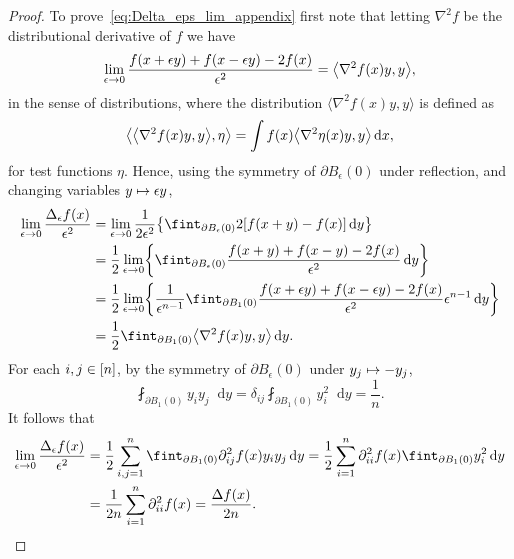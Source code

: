 \documentclass[AHL,Unicode,longabstracts]{cedram}
\newcommand{\dd}{n}
\newcommand*\diff{\mathop{}\!\mathrm{d}}
\newcommand{\avgint}{\fint}
\renewcommand*{\to}{\mathchoice{\longrightarrow}{\rightarrow}{\rightarrow}{\rightarrow}}
\let\oldmapsto\mapsto
\renewcommand*{\mapsto}{\mathchoice{\longmapsto}{\oldmapsto}{\oldmapsto}{\oldmapsto}}
\let\originalleft\left
\let\originalright\right
\renewcommand{\left}{\mathopen{}\mathclose\bgroup\originalleft}
\renewcommand{\right}{\aftergroup\egroup\originalright}
\let\oldin\in
\renewcommand{\in}{\mathchoice{\oldin}{\oldin}{\,\oldin\,}{\,\oldin\,}}
\begin{document}
\begin{proof}
To prove~\eqref{eq:Delta_eps_lim_appendix} first note that letting $ \nabla^2f$ be the distributional derivative of $f$ we have
\begin{align*}
\lim_{\epsilon\to 0}\frac{f(x+\epsilon y)+f(x-\epsilon y)-2f(x)}{\epsilon^2}=\left\langle \nabla^2f(x)y,y\right\rangle,
\end{align*}
in the sense of distributions, where the distribution $\langle \nabla^{2} f(x)y, y \rangle$ is defined as
\[
\left \langle \left\langle \nabla^{2} f(x)y, y \right\rangle, \eta \right \rangle =\int f(x) \left\langle \nabla^{2} \eta(x) y, y \right\rangle \diff x,
\]
for test functions $\eta$. Hence, using the symmetry of $\partial B_{\epsilon}(0)$ under reflection, and changing variables $y\mapsto \epsilon y$,
\begin{align*}
\lim_{\epsilon\to 0}\frac{\Delta_{\epsilon}f(x)}{\epsilon^2}&=\lim_{\epsilon\to 0}\frac{1}{2\epsilon^2}\left\{\avgint_{\partial B_{\epsilon}(0)}2[f(x+y)-f(x)]\diff y\right\}\\
&=\frac{1}{2}\lim_{\epsilon\to 0}\left\{\avgint_{\partial B_{\epsilon}(0)}\frac{f(x+y)+f(x-y)-2f(x)}{\epsilon^2}\diff y\right\}\\
&=\frac{1}{2}\lim_{\epsilon\to 0}\left\{\frac{1}{\epsilon^{\dd-1}}\avgint_{\partial B_{1}(0)}\frac{f(x+\epsilon y)+f(x-\epsilon y)-2f(x)}{\epsilon^2}\epsilon^{\dd-1}\diff y\right\}\\
&=\frac{1}{2}\avgint_{\partial B_{1}(0)}\left\langle \nabla^2f(x)y,y\right\rangle \diff y.
\end{align*}
For each $i,j\in [\dd]$, by the symmetry of $\partial B_{\epsilon}(0)$ under $y_j\mapsto -y_j$,
\[
\avgint_{\partial B_{1}(0)}y_iy_j \diff y=\delta_{ij}\avgint_{\partial B_{1}(0)}y_i^2 \diff y=\frac{1}{\dd}.
\]
It follows that
\begin{align*}
\lim_{\epsilon\to 0}\frac{\Delta_{\epsilon}f(x)}{\epsilon^2}&=\frac{1}{2}\sum_{i,j=1}^{\dd}\avgint_{\partial B_{1}(0)}\partial_{ij}^2f(x)y_iy_j \diff y=\frac{1}{2}\sum_{i=1}^{\dd}\partial_{ii}^2f(x)\avgint_{\partial B_{1}(0)}y_i^2\diff y\\
&=\frac{1}{2\dd}\sum_{i=1}^{\dd}\partial_{ii}^2f(x)=\frac{\Delta f(x)}{2\dd}.
\end{align*}




\end{proof}
\end{document}
